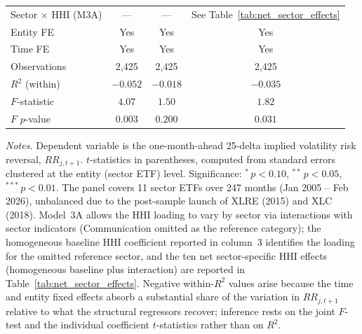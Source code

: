 \begin{table}[!htbp]
\begin{threeparttable}
\begin{tabular}{l c c c}
\midrule
Sector $\times$ HHI (M3A)    & ---             & ---             & See Table~\ref{tab:net_sector_effects} \\
Entity FE                    & Yes             & Yes             & Yes             \\
Time FE                      & Yes             & Yes             & Yes             \\
Observations                 & 2{,}425         & 2{,}425         & 2{,}425         \\
$R^2$ (within)               & $-0.052$        & $-0.018$        & $-0.035$        \\
$F$-statistic                & $4.07$          & $1.50$          & $1.82$          \\
$F$ $p$-value                & $0.003$         & $0.200$         & $0.031$         \\
\bottomrule
\end{tabular}

\begin{tablenotes}[flushleft]
\footnotesize
\item \textit{Notes.} Dependent variable is the one-month-ahead 25-delta implied
volatility risk reversal, $RR_{j,t+1}$. $t$-statistics in parentheses, computed
from standard errors clustered at the entity (sector ETF) level. Significance:
$^{*}\,p<0.10$, $^{**}\,p<0.05$, $^{***}\,p<0.01$. The panel covers 11 sector
ETFs over 247 months (Jan 2005 -- Feb 2026), unbalanced due to the post-sample
launch of XLRE (2015) and XLC (2018). Model~3A allows the HHI loading to vary
by sector via interactions with sector indicators (Communication omitted as the
reference category); the homogeneous baseline HHI coefficient reported in column~3
identifies the loading for the omitted reference sector, and the ten net
sector-specific HHI effects (homogeneous baseline plus interaction) are reported
in Table~\ref{tab:net_sector_effects}. Negative within-$R^{2}$ values arise
because the time and entity fixed effects absorb a substantial share of the
variation in $RR_{j,t+1}$ relative to what the structural regressors recover;
inference rests on the joint $F$-test and the individual coefficient $t$-statistics
rather than on $R^{2}$.
\end{tablenotes}
\end{threeparttable}

\end{table}
